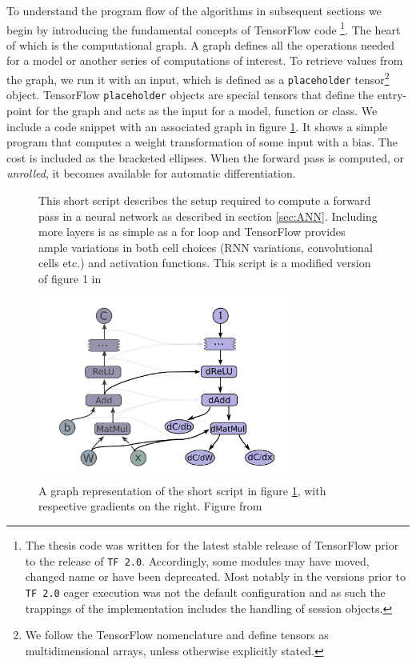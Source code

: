 To understand the program flow of the algorithms in subsequent sections we begin by introducing the fundamental concepts of TensorFlow code \footnote{The thesis code was written for the latest stable release of TensorFlow prior to the release of \lstinline{TF 2.0}. Accordingly, some modules may have moved, changed name or have been deprecated. Most notably in the versions prior to \lstinline{TF 2.0} eager execution was not the default configuration and as such the trappings of the implementation includes the handling of session objects.}. The heart of which is the computational graph. A graph defines all the operations needed for a model or another series of computations of interest. To retrieve values from the graph, we run it with an input, which is defined as a \lstinline{placeholder} tensor\footnote{We follow the TensorFlow nomenclature and define tensors as multidimensional arrays, unless otherwise explicitly stated.} object. TensorFlow \lstinline{placeholder} objects are special tensors that define the entry-point for the graph and acts as the input for a model, function or class. We include a code snippet with an associated graph in figure \ref{fig:graph}. It shows a simple program that computes a weight transformation of some input with a bias. The cost is included as the bracketed ellipses. When the forward pass is computed, or \textit{unrolled}, it becomes available for automatic differentiation. 

\begin{figure}
\centering
\begin{minipage}[c]{\linewidth}

\end{minipage}
\caption[A forward pass in TensorFlow]{This short script describes the setup required to compute a forward pass in a neural network as described in section \ref{sec:ANN}. Including more layers is as simple as a for loop and TensorFlow provides ample variations in both cell choices (RNN variations, convolutional cells etc.) and activation functions. This script is a modified version of figure 1 in \cite{tensorflow}}\label{fig:graph}
\end{figure}

\begin{figure}
\centering
\includegraphics[height=6cm]{../snippets/gradients_graph.png}
\caption[Graph representation of the forward pass and gradients of a simple dense neural network]{A graph representation of the short script in figure \ref{fig:graph}, with respective gradients on the right. Figure from \citet{tensorflow}}\label{fig:grad_graph}
\end{figure}

